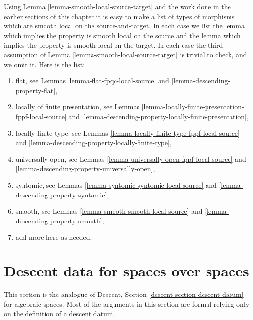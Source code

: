 \begin{remark}
\label{remark-list-local-source-target}
Using
Lemma \ref{lemma-smooth-local-source-target}
and the work done in the earlier sections of this chapter it is easy
to make a list of types of morphisms which are smooth local on the
source-and-target. In each case we list the lemma which implies
the property is smooth local on the source and the lemma which implies
the property is smooth local on the target. In each case the third assumption
of
Lemma \ref{lemma-smooth-local-source-target}
is trivial to check, and we omit it. Here is the list:
\begin{enumerate}
\item flat, see
Lemmas \ref{lemma-flat-fpqc-local-source} and
\ref{lemma-descending-property-flat},
\item locally of finite presentation, see
Lemmas \ref{lemma-locally-finite-presentation-fppf-local-source} and
\ref{lemma-descending-property-locally-finite-presentation},
\item locally finite type, see
Lemmas \ref{lemma-locally-finite-type-fppf-local-source} and
\ref{lemma-descending-property-locally-finite-type},
\item universally open, see
Lemmas \ref{lemma-universally-open-fppf-local-source} and
\ref{lemma-descending-property-universally-open},
\item syntomic, see
Lemmas \ref{lemma-syntomic-syntomic-local-source} and
\ref{lemma-descending-property-syntomic},
\item smooth, see
Lemmas \ref{lemma-smooth-smooth-local-source} and
\ref{lemma-descending-property-smooth},
\item add more here as needed.
\end{enumerate}
\end{remark}




\section{Descent data for spaces over spaces}
\label{section-descent-datum}

\noindent
This section is the analogue of Descent, Section
\ref{descent-section-descent-datum} for algebraic spaces.
Most of the arguments in this section are formal relying only
on the definition of a descent datum.

